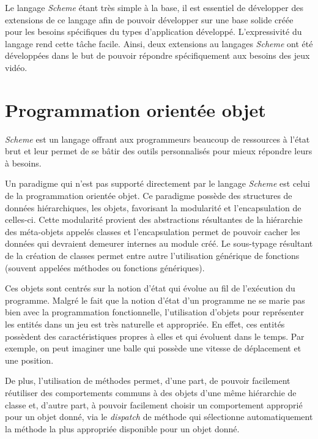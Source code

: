 \documentclass[12pt,twoside,letterpaper,francais]{book}
\newcommand{\Schemelang}{{\textit{Scheme }}}
\begin{document}
Le langage \Schemelang étant très simple à la base, il est essentiel de
développer des extensions de ce langage afin de pouvoir développer sur
une base solide créée pour les besoins spécifiques du types
d'application développé. L'expressivité du langage rend cette tâche
facile. Ainsi, deux extensions au langages \Schemelang ont été développées
dans le but de pouvoir répondre spécifiquement aux besoins des jeux
vidéo.

\clearpage

\chapter{Programmation orientée objet}\label{Chap:OO}
\Schemelang est un langage offrant aux programmeurs beaucoup de ressources
à l'état brut et leur permet de se bâtir des outils personnalisés pour
mieux répondre leurs à besoins.

Un paradigme qui n'est pas supporté directement par le langage \Schemelang
est celui de la programmation orientée objet. Ce paradigme possède des
structures de données hiérarchiques, les objets, favorisant la
modularité et l'encapsulation de celles-ci. Cette modularité provient
des abstractions résultantes de la hiérarchie des méta-objets appelés
classes et l'encapsulation permet de pouvoir cacher les données qui
devraient demeurer internes au module créé.  Le sous-typage résultant
de la création de classes permet entre autre l'utilisation générique
de fonctions (souvent appelées méthodes ou fonctions génériques).

Ces objets sont centrés sur la notion d'état qui évolue au fil de
l'exécution du programme. Malgré le fait que la notion d'état d'un
programme ne se marie pas bien avec la programmation fonctionnelle,
l'utilisation d'objets pour représenter les entités dans un jeu est
très naturelle et appropriée. En effet, ces entités possèdent des
caractéristiques propres à elles et qui évoluent dans le temps. Par
exemple, on peut imaginer une balle qui possède une vitesse de
déplacement et une position.

De plus, l'utilisation de méthodes permet, d'une part, de pouvoir
facilement réutiliser des comportements communs à des objets d'une
même hiérarchie de classe et, d'autre part, à pouvoir facilement
choisir un comportement approprié pour un objet donné, via le
\textit{dispatch} de méthode qui sélectionne automatiquement la
méthode la plus appropriée disponible pour un objet donné.
\end{document}
